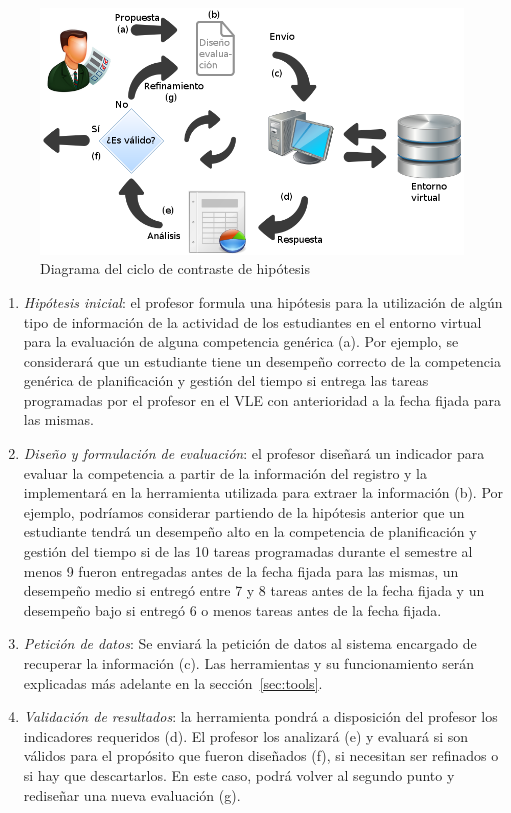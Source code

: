 \begin{figure}
  \begin{center}
    \includegraphics[scale=0.45]{CCHDiagram.png}
  \end{center}
  \caption{Diagrama del ciclo de contraste de hipótesis}
  \label{fig:CCHDiagram}
\end{figure}

\begin{enumerate}
\item \emph{Hipótesis inicial}: el profesor formula una hipótesis para la utilización de algún tipo de información de la actividad de los estudiantes en el entorno virtual para la evaluación de alguna competencia genérica (a). Por ejemplo, se considerará que un estudiante tiene un desempeño correcto de la competencia genérica de planificación y gestión del tiempo si entrega las tareas programadas por el profesor en el VLE con anterioridad a la fecha fijada para las mismas.
\item \emph{Diseño y formulación de evaluación}: el profesor diseñará un indicador para evaluar la competencia a partir de la información del registro y la implementará en la herramienta utilizada para extraer la información (b). Por ejemplo, podríamos considerar partiendo de la hipótesis anterior que un estudiante tendrá un desempeño alto en la competencia de planificación y gestión del tiempo si de las 10 tareas programadas durante el semestre al menos 9 fueron entregadas antes de la fecha fijada para las mismas, un desempeño medio si entregó entre 7 y 8 tareas antes de la fecha fijada y un desempeño bajo si entregó 6 o menos tareas antes de la fecha fijada.
\item \emph{Petición de datos}: Se enviará la petición de datos al sistema encargado de recuperar la información (c). Las herramientas y su funcionamiento serán explicadas más adelante en la sección~\ref{sec:tools}.
\item \emph{Validación de resultados}: la herramienta pondrá a disposición del profesor los indicadores requeridos (d). El profesor los analizará (e) y evaluará si son válidos para el propósito que fueron diseñados (f), si necesitan ser refinados o si hay que descartarlos. En este caso, podrá volver al segundo punto y rediseñar una nueva evaluación (g).
\end{enumerate}

